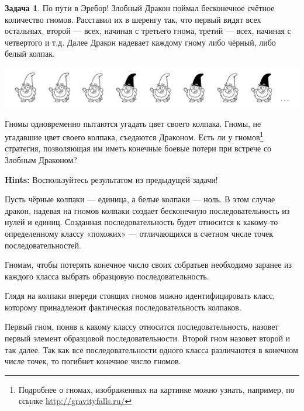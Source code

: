 \documentclass[pdftex, 12pt, a4paper]{article}
\theoremstyle{definition} %
\newtheorem{problem}{Задача}
\numberwithin{problem}{section}
\numberwithin{blits}{section}
\begin{document}
\begin{problem}По пути в Эребор!
Злобный Дракон поймал бесконечное счётное количество гномов. Расставил их в шеренгу так, что первый видят всех остальных, второй --- всех, начиная с третьего гнома, третий --- всех, начиная с четвертого и т.д. Далее Дракон надевает каждому гному либо чёрный, либо белый колпак.

\begin{center}
\includegraphics[scale=0.5]{dwarfs}
\end{center}

 Гномы одновременно пытаются угадать цвет своего колпака. Гномы, не угадавшие цвет своего колпака, съедаются Драконом. Есть ли у гномов\footnote{Подробнее о гномах, изображенных на картинке можно узнать, например, по ссылке \url{http://gravityfalls.ru/}} стратегия, позволяющая им иметь конечные боевые потери при встрече со Злобным Драконом?

\textbf{Hints:} Воспользуйтесь результатом из предыдущей задачи!

\begin{sol}
Пусть чёрные колпаки --- единица, а белые колпаки --- ноль. В этом случае дракон, надевая на гномов колпаки создает бесконечную последовательность из нулей и единиц. Созданная последовательность будет относится к какому-то определенному классу «похожих» --- отличающихся в счетном числе точек последовательностей.

Гномам, чтобы потерять конечное число своих собратьев необходимо заранее из каждого класса выбрать образцовую последовательность.

Глядя на колпаки впереди стоящих гномов можно идентифицировать класс, которому принадлежит фактическая последовательность колпаков.

Первый гном, поняв к какому классу относится последовательность, назовет первый элемент образцовой последовательности. Второй гном назовет второй и так далее. Так как все последовательности одного класса различаются в конечном числе точек, то погибнет конечное число гномов.
\end{sol}
\end{problem}
\end{document}
